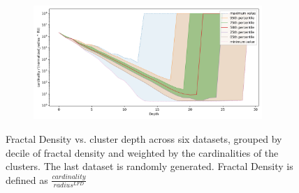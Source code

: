 \begin{figure}[ht!]
\begin{subfigure}[b]{0.47\textwidth}
    \label{fig:results:silva-fractal_density}
    \end{subfigure}%
    \begin{subfigure}[b]{0.47\textwidth}
    \includegraphics[width=0.95\textwidth]{images/fractal_density/random-1000000.png}\\
    \label{fig:results:random-fractal_density}
    \end{subfigure}
    \vspace{1em}
    \caption{Fractal Density vs. cluster depth across six datasets, grouped by decile of fractal density and weighted by the cardinalities of the clusters.
    The last dataset is randomly generated.
    Fractal Density is defined as $\frac{cardinality}{radius^{LFD}}$}
    \label{fig:results:fractal_density-plots}
\end{figure}
% 
% 